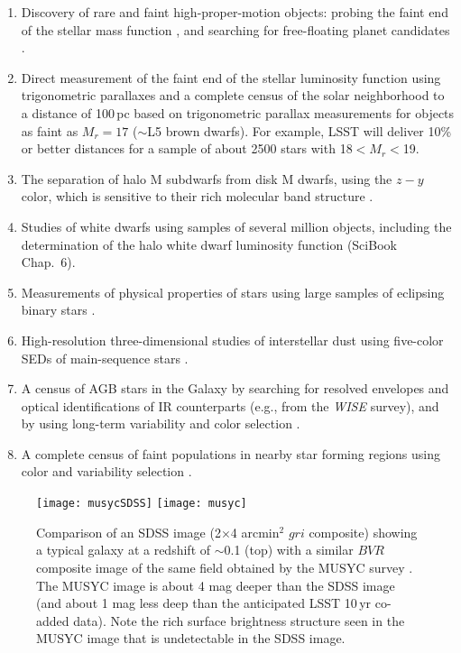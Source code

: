 \begin{enumerate}
\item Discovery of rare and faint high-proper-motion objects: probing the
          faint end of the stellar mass function \citep{2008AJ....135.2177L,2010AJ....140..844F}, and searching for
          free-floating planet candidates \citep{2000MNRAS.314..858L,2014ApJ...786L..18L}.

\item Direct measurement of the faint end of the stellar luminosity function
          using trigonometric parallaxes \citep{2002AJ....124.2721R} and a complete census of the
          solar neighborhood to a distance of 100\,pc based on trigonometric parallax measurements for objects as faint as
          $M_r=17$ ($\sim$L5 brown dwarfs). For example, LSST will deliver 10\% or better distances for a sample of about 2500 stars
          with 18$<M_r<$19.

\item The separation of halo M subdwarfs from disk M dwarfs, using the $z-y$ color, which is sensitive to their rich molecular band
          structure \citep{2011ASPC..448..531W,2013AJ....145...40B}.

\item Studies of white dwarfs using samples of several million objects, including the determination of the halo white dwarf luminosity
          function (SciBook Chap.~6).

\item Measurements of physical properties of stars using large samples of eclipsing binary stars \citep{2013AAS...22111601S}.

\item High-resolution three-dimensional studies of interstellar dust using five-color
          SEDs of main-sequence stars \citep{2011A&A...536A..23P,2012ApJ...757..166B,2014ApJ...783..114G}.

\item A census of AGB stars in the Galaxy by searching for resolved envelopes and optical  identifications of IR counterparts
         (e.g., from the \textit{WISE} survey), and by using long-term variability and color selection \citep{2007ASPC..378..485I}.

\item A complete census of faint populations in nearby star forming regions using
          color and variability selection \citep[e.g.][]{2005AJ....129..907B}.

\end{enumerate}


\begin{figure}
\texttt{[image: musycSDSS]}
\texttt{[image: musyc]}
\caption{
Comparison of an SDSS image (2$\times$4 arcmin$^2$ $gri$ composite) showing a typical galaxy at
a redshift of $\sim$0.1 (top) with a similar $BVR$ composite image of the same field obtained by the MUSYC survey
\citep[bottom;][]{2006ApJS..162....1G}. The MUSYC image is about 4 mag deeper than the SDSS image (and about 1 mag less deep
than the anticipated LSST 10\,yr co-added data). Note the rich surface brightness structure seen in the MUSYC
image that is undetectable in the SDSS image.}
\label{Fig:musyc}
\end{figure}


